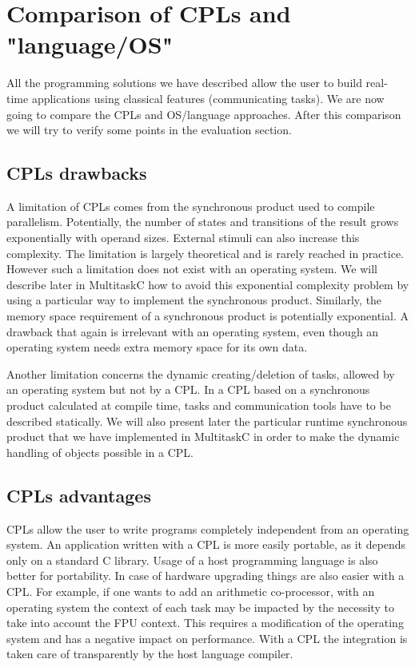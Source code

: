 \documentclass[10pt]{report}
\begin{document}
\section{Comparison of CPLs and "language/OS"}

All the programming solutions we have described allow the user to build real-time applications using classical features
(communicating tasks). We are now going to compare the CPLs and OS/language approaches. After this comparison we will try
to verify some points in the evaluation section.

\subsection{CPLs drawbacks}

A limitation of CPLs comes from the synchronous product used to compile parallelism. Potentially, the number of states and transitions 
of the result grows exponentially with operand sizes. External stimuli can also increase this complexity. The limitation is largely theoretical 
and is rarely reached in practice. However such a limitation does not exist with an operating system. We will describe later in MultitaskC 
how to avoid this exponential complexity problem by using a particular way to implement the synchronous product. Similarly, the memory space requirement 
of a synchronous product is potentially exponential. A drawback that again is irrelevant with an operating system, even though an operating system 
needs extra memory space for its own data.

Another limitation concerns the dynamic creating/deletion of tasks, allowed by an operating system but not by a CPL. In a CPL 
based on a synchronous product calculated at compile time, tasks and communication tools have to be described statically. We will also
present later the particular runtime synchronous product that we have implemented in MultitaskC in order to make the dynamic handling of objects 
possible in a CPL.

\subsection{CPLs advantages}

CPLs allow the user to write programs completely independent from an operating system. An application written with a CPL
is more easily portable, as it depends only on a standard C library. Usage of a host programming language is also better for portability.
In case of hardware upgrading things are also easier with a CPL. For example, if one wants to add an arithmetic co-processor, 
with an operating system the context of each task may be impacted by the necessity to take into account the FPU context. This requires 
a modification of the operating system and has a negative impact on performance. With a CPL the integration is taken care of transparently 
by the host language compiler.
\end{document}
